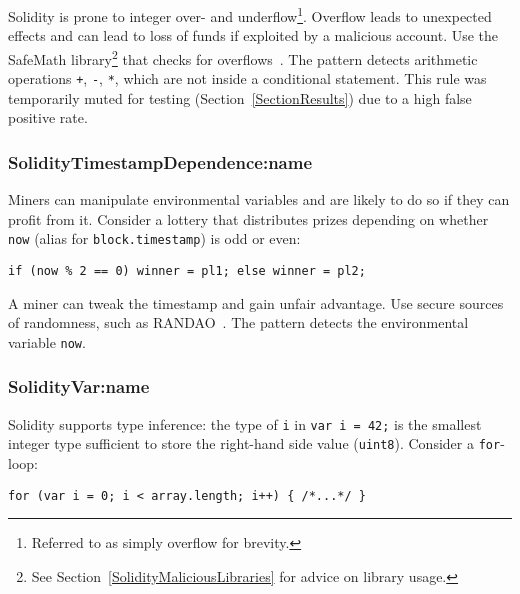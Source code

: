 Solidity is prone to integer over- and underflow\footnote{Referred to as simply overflow for brevity.}.
Overflow leads to unexpected effects and can lead to loss of funds if exploited by a malicious account.
Use the SafeMath library\footnote{See Section~\ref{SolidityMaliciousLibraries} for advice on library usage.} that checks for overflows~\cite{OpenZeppelin2017}.
The pattern detects arithmetic operations \texttt{+}, \texttt{-}, \texttt{*}, which are not inside a conditional statement.
This rule was temporarily muted for testing (Section~\ref{SectionResults}) due to a high false positive rate.


\subsubsection{\let\letcs\texapiletcs \usevalue SolidityTimestampDependence:name \let\letcs\etoolboxletcs} \label{SolidityTimestampDependence}

Miners can manipulate environmental variables and are likely to do so if they can profit from it.
Consider a lottery that distributes prizes depending on whether \texttt{now} (alias for \texttt{block.timestamp}) is odd or even:

\begin{lstlisting}[language=Solidity]
	if (now % 2 == 0) winner = pl1; else winner = pl2;
\end{lstlisting}

A miner can tweak the timestamp and gain unfair advantage.
Use secure sources of randomness, such as RANDAO~\cite{RANDAO2017}.
The pattern detects the environmental variable \texttt{now}.

\subsubsection{\let\letcs\texapiletcs \usevalue SolidityVar:name \let\letcs\etoolboxletcs} \label{SolidityVar}

Solidity supports type inference: the type of \texttt{i} in \texttt{var i = 42;} is the smallest integer type sufficient to store the right-hand side value (\texttt{uint8}).
Consider a \texttt{for}-loop:

\begin{lstlisting}[language=Solidity]
for (var i = 0; i < array.length; i++) { /*...*/ }
\end{lstlisting}


